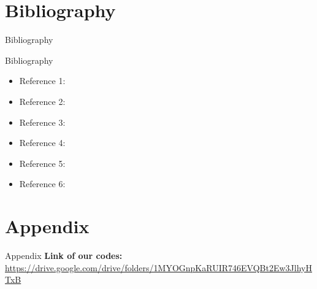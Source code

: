 \documentclass[10pt]{beamer}
\begin{document}
\section{Bibliography}
\begin{frame}[allowframebreaks]{Bibliography}
\end{frame}

\begin{frame}{Bibliography}
    \begin{itemize}
        \item Reference 1: \cite{trapezoidal_area_analysis}
        \item Reference 2: \cite{arxiv_time_series}
        \item Reference 3: \cite{ieee_forecasting}
        \item Reference 4: \cite{numerical_analysis}
        \item Reference 5: \cite{sciencedirect_weather}
        \item Reference 6: \cite{harvard_unit27}
    \end{itemize}
\end{frame}

\section{Appendix}
\begin{frame}{Appendix}
    \textbf{Link of our codes:} 
    \singlespacing
    \url{https://drive.google.com/drive/folders/1MYOGnpKaRUIR746EVQBt2Ew3JlhyHTxB}
\end{frame}
\end{document}
